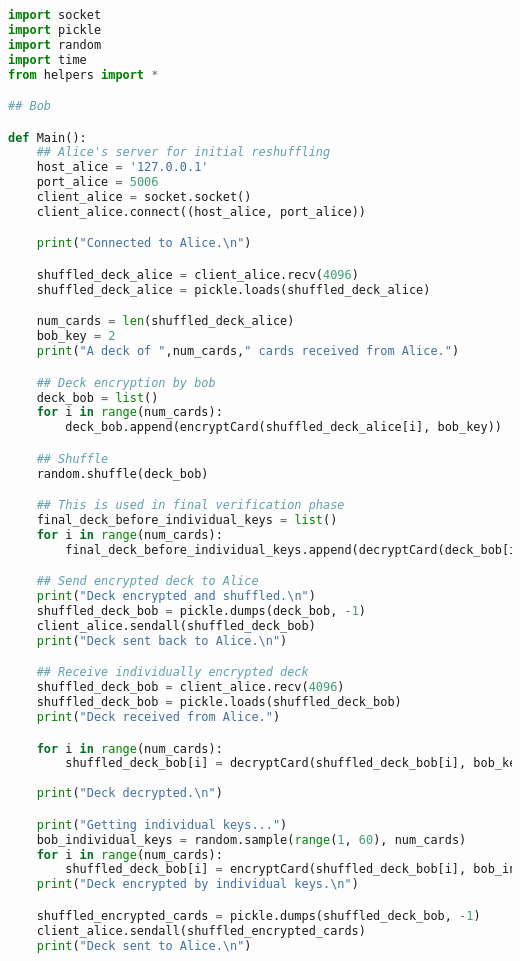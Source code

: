 \documentclass{article}
\begin{document}
\begin{lstlisting}[language=Python, caption=bob.py]
import socket
import pickle
import random
import time
from helpers import *

## Bob

def Main():
    ## Alice's server for initial reshuffling
    host_alice = '127.0.0.1'
    port_alice = 5006
    client_alice = socket.socket()
    client_alice.connect((host_alice, port_alice))

    print("Connected to Alice.\n")

    shuffled_deck_alice = client_alice.recv(4096)
    shuffled_deck_alice = pickle.loads(shuffled_deck_alice)

    num_cards = len(shuffled_deck_alice)
    bob_key = 2
    print("A deck of ",num_cards," cards received from Alice.")

    ## Deck encryption by bob
    deck_bob = list()
    for i in range(num_cards):
        deck_bob.append(encryptCard(shuffled_deck_alice[i], bob_key))

    ## Shuffle
    random.shuffle(deck_bob)

    ## This is used in final verification phase
    final_deck_before_individual_keys = list()
    for i in range(num_cards):
        final_deck_before_individual_keys.append(decryptCard(deck_bob[i], bob_key))

    ## Send encrypted deck to Alice
    print("Deck encrypted and shuffled.\n")
    shuffled_deck_bob = pickle.dumps(deck_bob, -1)
    client_alice.sendall(shuffled_deck_bob)
    print("Deck sent back to Alice.\n")

    ## Receive individually encrypted deck
    shuffled_deck_bob = client_alice.recv(4096)
    shuffled_deck_bob = pickle.loads(shuffled_deck_bob)
    print("Deck received from Alice.")

    for i in range(num_cards):
        shuffled_deck_bob[i] = decryptCard(shuffled_deck_bob[i], bob_key)
    
    print("Deck decrypted.\n")

    print("Getting individual keys...")
    bob_individual_keys = random.sample(range(1, 60), num_cards)
    for i in range(num_cards):
        shuffled_deck_bob[i] = encryptCard(shuffled_deck_bob[i], bob_individual_keys[i])
    print("Deck encrypted by individual keys.\n")

    shuffled_encrypted_cards = pickle.dumps(shuffled_deck_bob, -1)
    client_alice.sendall(shuffled_encrypted_cards)
    print("Deck sent to Alice.\n")


\end{lstlisting}
\end{document}
